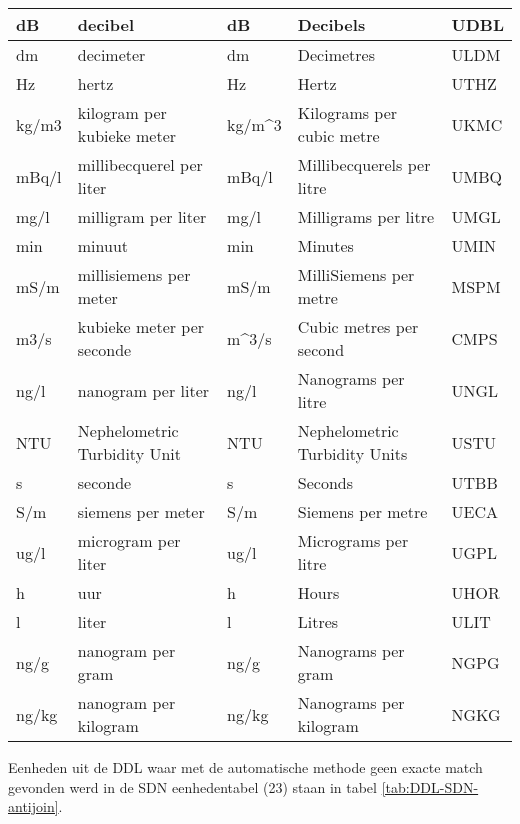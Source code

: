 \documentclass[
]{book}
\begin{document}
\begin{table}
\begin{tabular}[t]{l|l|l|l|l}
\hline
dB & decibel & dB & Decibels & UDBL\\
\hline
dm & decimeter & dm & Decimetres & ULDM\\
\hline
Hz & hertz & Hz & Hertz & UTHZ\\
\hline
kg/m3 & kilogram per kubieke meter & kg/m\textasciicircum{}3 & Kilograms per cubic metre & UKMC\\
\hline
mBq/l & millibecquerel per liter & mBq/l & Millibecquerels per litre & UMBQ\\
\hline
mg/l & milligram per liter & mg/l & Milligrams per litre & UMGL\\
\hline
min & minuut & min & Minutes & UMIN\\
\hline
mS/m & millisiemens per meter & mS/m & MilliSiemens per metre & MSPM\\
\hline
m3/s & kubieke meter per seconde & m\textasciicircum{}3/s & Cubic metres per second & CMPS\\
\hline
ng/l & nanogram per liter & ng/l & Nanograms per litre & UNGL\\
\hline
NTU & Nephelometric Turbidity Unit & NTU & Nephelometric Turbidity Units & USTU\\
\hline
s & seconde & s & Seconds & UTBB\\
\hline
S/m & siemens per meter & S/m & Siemens per metre & UECA\\
\hline
ug/l & microgram per liter & ug/l & Micrograms per litre & UGPL\\
\hline
h & uur & h & Hours & UHOR\\
\hline
l & liter & l & Litres & ULIT\\
\hline
ng/g & nanogram per gram & ng/g & Nanograms per gram & NGPG\\
\hline
ng/kg & nanogram per kilogram & ng/kg & Nanograms per kilogram & NGKG\\
\hline
\end{tabular}
\end{table}

Eenheden uit de DDL waar met de automatische methode geen exacte match gevonden werd in de SDN eenhedentabel (23) staan in tabel \ref{tab:DDL-SDN-antijoin}.
\end{document}
